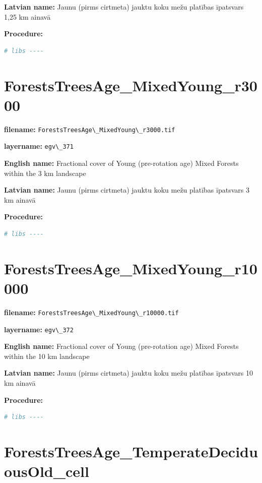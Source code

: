 \documentclass[
]{book}
\newcommand{\passthrough}[1]{#1}
\begin{document}
\textbf{Latvian name:} Jaunu (pirms cirtmeta) jauktu koku mežu platības īpatsvars 1,25 km ainavā

\textbf{Procedure:}

\begin{lstlisting}[language=R]
# libs ----
\end{lstlisting}

\section{ForestsTreesAge\_MixedYoung\_r3000}\label{ch06.371}

\textbf{filename:} \passthrough{\lstinline!ForestsTreesAge\_MixedYoung\_r3000.tif!}

\textbf{layername:} \passthrough{\lstinline!egv\_371!}

\textbf{English name:} Fractional cover of Young (pre-rotation age) Mixed Forests within the 3 km landscape

\textbf{Latvian name:} Jaunu (pirms cirtmeta) jauktu koku mežu platības īpatsvars 3 km ainavā

\textbf{Procedure:}

\begin{lstlisting}[language=R]
# libs ----
\end{lstlisting}

\section{ForestsTreesAge\_MixedYoung\_r10000}\label{ch06.372}

\textbf{filename:} \passthrough{\lstinline!ForestsTreesAge\_MixedYoung\_r10000.tif!}

\textbf{layername:} \passthrough{\lstinline!egv\_372!}

\textbf{English name:} Fractional cover of Young (pre-rotation age) Mixed Forests within the 10 km landscape

\textbf{Latvian name:} Jaunu (pirms cirtmeta) jauktu koku mežu platības īpatsvars 10 km ainavā

\textbf{Procedure:}

\begin{lstlisting}[language=R]
# libs ----
\end{lstlisting}

\section{ForestsTreesAge\_TemperateDeciduousOld\_cell}\label{ch06.373}
\end{document}
